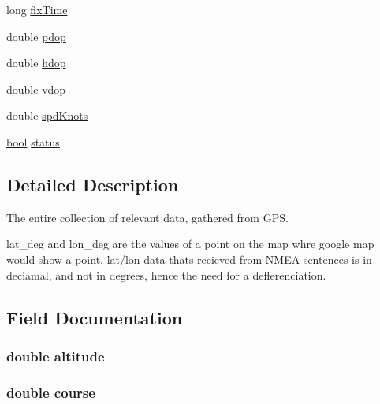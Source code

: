 \begin{DoxyCompactItemize}
long \hyperlink{struct_full_g_p_s_data_a820d96504a74d9f1ab7ae4d962a878ba}{fix\+Time}
\item 
double \hyperlink{struct_full_g_p_s_data_a387b6cbd184865365f92d29fd1ac32c1}{pdop}
\item 
double \hyperlink{struct_full_g_p_s_data_a7ede759392ed439219bdbac4c8ede827}{hdop}
\item 
double \hyperlink{struct_full_g_p_s_data_a4001a0f05d0c57ebdb066d738098bff7}{vdop}
\item 
double \hyperlink{struct_full_g_p_s_data_aafd79f80d0c8c393f4ddad96148f6175}{spd\+Knots}
\item 
\hyperlink{types_8h_af6a258d8f3ee5206d682d799316314b1}{bool} \hyperlink{struct_full_g_p_s_data_ad1f0bff7112206922c9d5a87adad6f2b}{status}
\end{DoxyCompactItemize}


\subsection{Detailed Description}
The entire collection of relevant data, gathered from G\+PS. 

lat\+\_\+deg and lon\+\_\+deg are the values of a point on the map whre google map would show a point. lat/lon data that\textquotesingle{}s recieved from N\+M\+EA sentences is in deciamal, and not in degrees, hence the need for a defferenciation. 

\subsection{Field Documentation}
\subsubsection[{\texorpdfstring{altitude}{altitude}}]{\setlength{\rightskip}{0pt plus 5cm}double altitude}\hypertarget{struct_full_g_p_s_data_a2b13d276aee0d9fd646c8fa3647e869b}{}\label{struct_full_g_p_s_data_a2b13d276aee0d9fd646c8fa3647e869b}
\subsubsection[{\texorpdfstring{course}{course}}]{\setlength{\rightskip}{0pt plus 5cm}double course}\hypertarget{struct_full_g_p_s_data_acaa2fde7e3fad7df8f5755347603d17b}{}\label{struct_full_g_p_s_data_acaa2fde7e3fad7df8f5755347603d17b}
